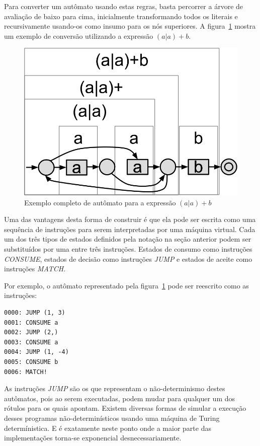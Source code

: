 \documentclass[a4paper,12pt,oneside,onecolumn]{uerj}
\begin{document}
Para converter um autômato usando estas regras, basta percorrer a árvore de avaliação de baixo para cima, inicialmente transformando todos os literais e recursivamente usando-os como insumo para os nós superiores. A figura~\ref{fig:exemplo_automato_completo} mostra um exemplo de conversão utilizando a expressão $(a|a)+b$.

\begin{figure}[ht]
  \centering
  \includegraphics[scale=0.33]{figures/exemplo_automato_completo.png}
  \caption{Exemplo completo de autômato para a expressão $(a|a)+b$}
  \label{fig:exemplo_automato_completo}
\end{figure}

Uma das vantagens desta forma de construir é que ela pode ser escrita como uma sequência de instruções para serem interpretadas por uma máquina virtual. Cada um dos três tipos de estados definidos pela notação na seção anterior podem ser substituídos por uma entre três instruções. Estados de consumo como instruções \emph{CONSUME}, estados de decisão como instruções \emph{JUMP} e estados de aceite como instruções \emph{MATCH}.

Por exemplo, o autômato representado pela figura~\ref{fig:exemplo_automato_completo} pode ser reescrito como as instruções:

\nopagebreak 
\begin{verbatim}
0000: JUMP (1, 3)
0001: CONSUME a
0002: JUMP (2,)
0003: CONSUME a
0004: JUMP (1, -4)
0005: CONSUME b
0006: MATCH!
\end{verbatim}

As instruções \emph{JUMP} são os que representam o não-determinismo destes autômatos, pois ao serem executadas, podem mudar para qualquer um dos rótulos para os quais apontam. Existem diversas formas de simular a execução desses programas não-determinísticos usando uma máquina de Turing determínistica. E é exatamente neste ponto onde a maior parte das implementações torna-se exponencial desnecessariamente.
\end{document}
